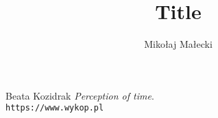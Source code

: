 \documentclass[13pt]{article}
\title{Title}
\author{Mikołaj Małecki}
\begin{document}
	\maketitle








\begin{thebibliography}{9}
Beata Kozidrak
\textit{Perception of time}. 
\\\texttt{https://www.wykop.pl}
\end{thebibliography}
\end{document}
